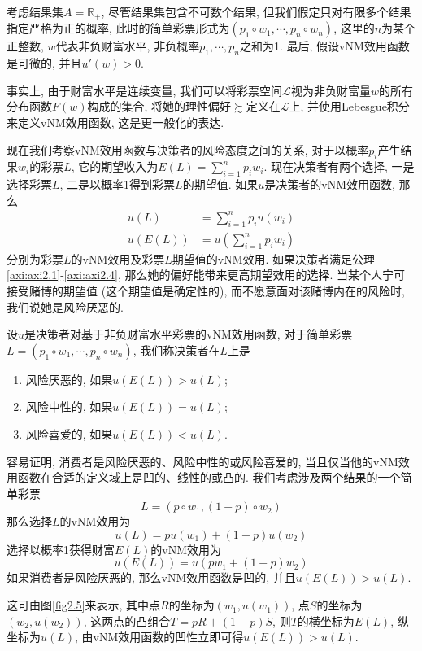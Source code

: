 \documentclass[cn, 12pt, math=mtpro2, bibstyle=apa, blue]{elegantbook}
\newcommand{\R}{\mathbb{R}}
\begin{document}
考虑结果集$A=\R_+$, 尽管结果集包含不可数个结果, 但我们假定只对有限多个结果指定严格为正的概率, 此时的简单彩票形式为$(p_1\circ w_1,\cdots,p_n\circ w_n)$, 这里的$n$为某个正整数, $w$代表非负财富水平, 非负概率$p_1,\cdots,p_n$之和为1. 最后, 假设vNM效用函数是可微的, 并且$u'(w)>0$.

\begin{remark}
事实上, 由于财富水平是连续变量, 我们可以将彩票空间$\mathscr{L}$视为非负财富量$w$的所有分布函数$F(w)$构成的集合, 将她的理性偏好$\succsim$定义在$\mathscr{L}$上, 并使用Lebesgue积分来定义vNM效用函数, 这是更一般化的表达.
\end{remark}

现在我们考察vNM效用函数与决策者的风险态度之间的关系, 对于以概率$p_i$产生结果$w_i$的彩票$L$, 它的期望收入为$E(L)=\sum_{i=1}^{n}p_iw_i$. 现在决策者有两个选择, 一是选择彩票$L$, 二是以概率1得到彩票$L$的期望值. 如果$u$是决策者的vNM效用函数, 那么
\begin{align*}
u(L)&=\sum_{i=1}^{n}p_iu(w_i) \\
u(E(L))&=u\left(\sum_{i=1}^{n}p_iw_i\right)
\end{align*}
分别为彩票$L$的vNM效用及彩票$L$期望值的vNM效用. 如果决策者满足公理\ref{axi:axi2.1}-\ref{axi:axi2.4}, 那么她的偏好能带来更高期望效用的选择. 当某个人宁可接受赌博的期望值 (这个期望值是确定性的), 而不愿意面对该赌博内在的风险时, 我们说她是风险厌恶的.

\begin{definition}[风险态度的分类]
设$u$是决策者对基于非负财富水平彩票的vNM效用函数, 对于简单彩票$L=(p_1\circ w_1,\cdots, p_n\circ w_n)$, 我们称决策者在$L$上是
\begin{enumerate}[\arabic*.]
  \item 风险厌恶的, 如果$u(E(L))>u(L)$;
  \item 风险中性的, 如果$u(E(L))=u(L)$;
  \item 风险喜爱的, 如果$u(E(L))<u(L)$.
\end{enumerate}
\end{definition}
容易证明, 消费者是风险厌恶的、风险中性的或风险喜爱的, 当且仅当他的vNM效用函数在合适的定义域上是凹的、线性的或凸的. 我们考虑涉及两个结果的一个简单彩票
$$L=(p\circ w_1,(1-p)\circ w_2)$$
那么选择$L$的vNM效用为
$$u(L)=pu(w_1)+(1-p)u(w_2)$$
选择以概率1获得财富$E(L)$的vNM效用为
$$u(E(L))=u(pw_1+(1-p)w_2)$$
如果消费者是风险厌恶的, 那么vNM效用函数是凹的, 并且$u(E(L))>u(L)$.

这可由图\ref{fig2.5}来表示, 其中点$R$的坐标为$(w_1,u(w_1))$, 点$S$的坐标为$(w_2,u(w_2))$, 这两点的凸组合$T=pR+(1-p)S$, 则$T$的横坐标为$E(L)$, 纵坐标为$u(L)$, 由vNM效用函数的凹性立即可得$u(E(L))>u(L)$.
\end{document}
